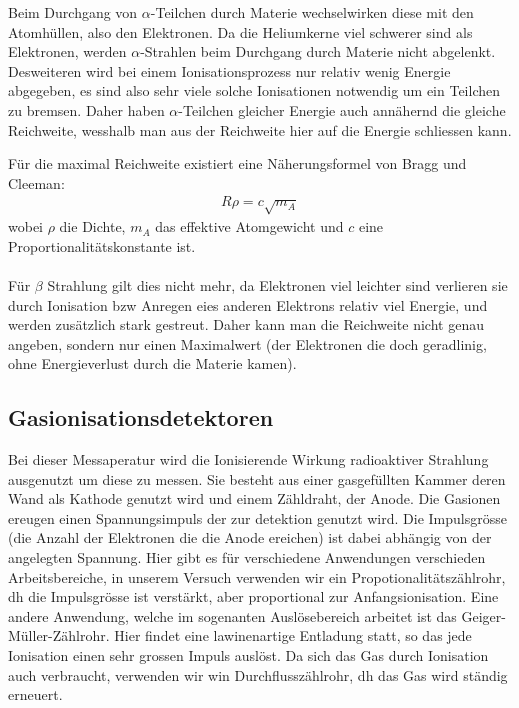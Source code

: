 \documentclass[12pt]{article}
\begin{document}
Beim Durchgang von $\alpha$-Teilchen durch Materie wechselwirken diese mit den Atomhüllen, also den Elektronen. Da die Heliumkerne viel schwerer sind als Elektronen, werden $\alpha$-Strahlen beim Durchgang durch Materie nicht abgelenkt. Desweiteren wird bei einem Ionisationsprozess nur relativ wenig Energie abgegeben, es sind also sehr viele solche Ionisationen notwendig um ein Teilchen zu bremsen. Daher haben $\alpha$-Teilchen gleicher Energie auch annähernd die gleiche Reichweite, wesshalb man aus der Reichweite hier auf die Energie schliessen kann. 

Für die maximal Reichweite existiert eine Näherungsformel von Bragg und Cleeman: 
\begin{align}
 \label{cleeman} R \rho=c\sqrt{m_A}
\end{align}
wobei $\rho$ die Dichte, $m_A$ das effektive Atomgewicht und $c$ eine Proportionalitätskonstante ist.
\\ \\
Für $\beta$ Strahlung gilt dies nicht mehr, da Elektronen viel leichter sind verlieren sie durch Ionisation bzw Anregen eies anderen Elektrons relativ viel Energie, und werden zusätzlich stark gestreut. Daher kann man die Reichweite nicht genau angeben, sondern nur einen Maximalwert (der Elektronen die doch geradlinig, ohne Energieverlust durch die Materie kamen).


\subsection{Gasionisationsdetektoren}

Bei dieser Messaperatur wird die Ionisierende Wirkung radioaktiver Strahlung ausgenutzt um diese zu messen. Sie besteht aus einer gasgefüllten Kammer deren Wand als Kathode genutzt wird und einem Zähldraht, der Anode. Die Gasionen ereugen einen Spannungsimpuls der zur detektion genutzt wird. Die Impulsgrösse (die Anzahl der Elektronen die die Anode ereichen) ist dabei abhängig von der angelegten Spannung. Hier gibt es für verschiedene Anwendungen verschieden Arbeitsbereiche, in unserem Versuch verwenden wir ein Propotionalitätszählrohr, dh die Impulsgrösse ist verstärkt, aber proportional zur Anfangsionisation. Eine andere Anwendung, welche im sogenanten Auslösebereich arbeitet ist das Geiger-Müller-Zählrohr. Hier findet eine lawinenartige Entladung statt, so das jede Ionisation einen sehr grossen Impuls auslöst. Da sich das Gas durch Ionisation auch verbraucht, verwenden wir win Durchflusszählrohr, dh das Gas wird ständig erneuert.
\end{document}
